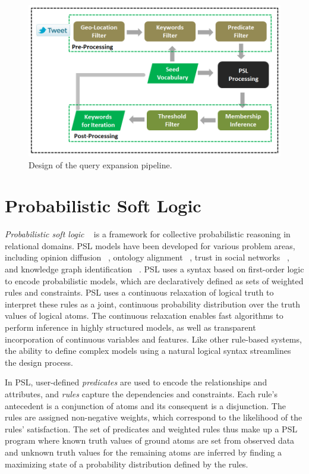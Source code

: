 
\begin{figure}
	\centering
	\includegraphics[scale=0.35]{support_files/flowChart2.PNG}
	\caption{Design of the query expansion pipeline.}
	\label{fig:flowchart}
\end{figure}
\section{Probabilistic Soft Logic}
\emph{Probabilistic soft logic} ~\cite{kimmig2012short,broecheler2010probabilistic} is a framework for collective probabilistic reasoning in relational domains.
PSL models have been developed for various problem areas, including opinion diffusion ~\cite{bach2012scaling}, ontology alignment ~\cite{broecheler2010probabilistic}, trust in social networks ~\cite{huang2013flexible}, and knowledge graph identification ~\cite{pujara2013knowledge}.
PSL uses a syntax based on first-order logic to encode probabilistic models, which are declaratively defined as sets of weighted rules and constraints. PSL uses a continuous relaxation of logical truth to interpret these rules as a joint, continuous probability distribution over the truth values of logical atoms. The continuous relaxation enables fast algorithms to perform inference in highly structured models, as well as transparent incorporation of continuous variables and features. Like other rule-based systems, the ability to define complex models using a natural logical syntax streamlines the design process.

In PSL, user-defined \emph{predicates} are used to encode the relationships and attributes, and \emph{rules} capture the dependencies and constraints.
Each rule's antecedent is a conjunction of atoms and its consequent is a disjunction. 
The rules are assigned non-negative weights, which correspond to the likelihood of the rules' satisfaction. 
The set of predicates and weighted rules thus make up a PSL program where known truth values of ground atoms are set from observed data and unknown truth values for the remaining atoms are inferred by finding a maximizing state of a probability distribution defined by the rules.

